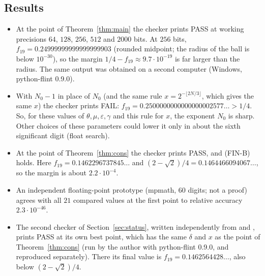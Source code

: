 \documentclass[11pt]{amsart}
\theoremstyle{remark}
\theoremstyle{plain}
\newcommand{\eps}{\varepsilon}
\begin{document}
\subsection*{Results}
\begin{itemize}[leftmargin=*]
\item At the point of Theorem~\ref{thm:main} the checker prints PASS at working precisions $64$, $128$, $256$, $512$ and $2000$ bits. At $256$ bits, $f_{19}=0.24999999999999999903$ (rounded midpoint; the radius of the ball is below $10^{-30}$), so the margin $1/4-f_{19}\approx9.7\cdot10^{-19}$ is far larger than the radius. The same output was obtained on a second computer (Windows, python-flint 0.9.0).
\item With $N_0-1$ in place of $N_0$ (and the same rule $x=2^{-\lfloor2N/3\rfloor}$, which gives the same $x$) the checker prints FAIL: $f_{19}=0.2500000000000000002577\ldots>1/4$. So, for these values of $\theta,\mu,\eps,\gamma$ and this rule for $x$, the exponent $N_0$ is sharp. Other choices of these parameters could lower it only in about the sixth significant digit (float search).
\item At the point of Theorem~\ref{thm:cons} the checker prints PASS, and (FIN-B) holds. Here $f_{19}=0.1462296737845\ldots$ and $(2-\sqrt2)/4=0.1464466094067\ldots$, so the margin is about $2.2\cdot10^{-4}$.
\item An independent floating-point prototype (mpmath, $60$ digits; not a proof) agrees with all $21$ compared values at the first point to relative accuracy $2.3\cdot10^{-46}$.
\item The second checker of Section~\ref{sec:status}, written independently from \cite{Bir00b} and \cite{Bir94}, prints PASS at its own best point, which has the same $\delta$ and $x$ as the point of Theorem~\ref{thm:cons} (run by the author with python-flint 0.9.0, and reproduced separately). There its final value is $f_{19}=0.1462564428\ldots$, also below $(2-\sqrt2)/4$.
\end{itemize}
\end{document}
